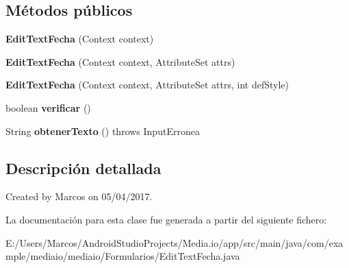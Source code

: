\subsection*{Métodos públicos}
\begin{DoxyCompactItemize}
\item 
\mbox{\label{classcom_1_1example_1_1mediaio_1_1mediaio_1_1_formularios_1_1_edit_text_fecha_a3429ce06c4e3926fd7784ba221cc8f40}} 
{\bfseries Edit\+Text\+Fecha} (Context context)
\item 
\mbox{\label{classcom_1_1example_1_1mediaio_1_1mediaio_1_1_formularios_1_1_edit_text_fecha_a1c8eab5de33c465974eac7f5b627898a}} 
{\bfseries Edit\+Text\+Fecha} (Context context, Attribute\+Set attrs)
\item 
\mbox{\label{classcom_1_1example_1_1mediaio_1_1mediaio_1_1_formularios_1_1_edit_text_fecha_ad0833582518d89718bd43dd1ce13edb5}} 
{\bfseries Edit\+Text\+Fecha} (Context context, Attribute\+Set attrs, int def\+Style)
\item 
\mbox{\label{classcom_1_1example_1_1mediaio_1_1mediaio_1_1_formularios_1_1_edit_text_fecha_a0942a50af68eda2f0b2ced126a3a937b}} 
boolean {\bfseries verificar} ()
\item 
\mbox{\label{classcom_1_1example_1_1mediaio_1_1mediaio_1_1_formularios_1_1_edit_text_fecha_a7cedad62657a08663dd46f45107cf2a5}} 
String {\bfseries obtener\+Texto} ()  throws Input\+Erronea     
\end{DoxyCompactItemize}


\subsection{Descripción detallada}
Created by Marcos on 05/04/2017. 

La documentación para esta clase fue generada a partir del siguiente fichero\+:\begin{DoxyCompactItemize}
\item 
E\+:/\+Users/\+Marcos/\+Android\+Studio\+Projects/\+Media.\+io/app/src/main/java/com/example/mediaio/mediaio/\+Formularios/Edit\+Text\+Fecha.\+java\end{DoxyCompactItemize}

